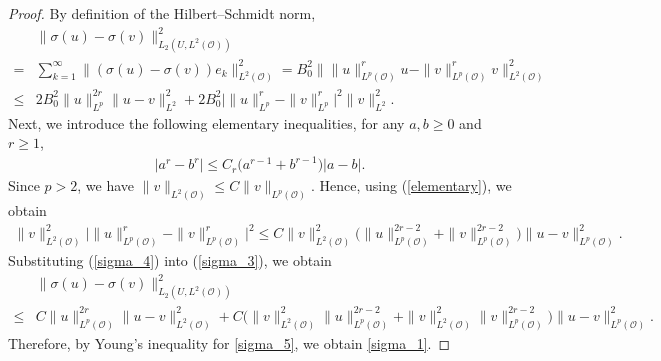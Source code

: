 \documentclass[reqno, 11pt]{amsart}
\theoremstyle{definition}
\numberwithin{equation}{section} \numberwithin{lem}{section}
\numberwithin{thm}{section} \numberwithin{prop}{section}
\numberwithin{cor}{section} \numberwithin{rem}{section}
\numberwithin{defn}{section}
\begin{document}
\begin{proof}
By definition of the Hilbert--Schmidt norm,
\begin{align}\label{sigma_3}
\nonumber&\|\sigma(u)-\sigma(v)\|_{L_2(U,L^2(\mathcal O))}^2
\\\nonumber=&
\sum_{k=1}^\infty \|(\sigma(u)-\sigma(v))e_k\|_{L^2(\mathcal O)}^2=
B_0^2
\big\|\|u\|_{L^p(\mathcal O)}^r u-\|v\|_{L^p(\mathcal O)}^r v\big\|_{L^2(\mathcal O)}^2\\
\le &2B_0^2\|u\|_{L^p}^{2r}\|u-v\|_{L^2}^2
+
2B_0^2\big|\|u\|_{L^p}^r-\|v\|_{L^p}^r\big|^2\|v\|_{L^2}^2.
\end{align}
Next, we introduce the following elementary inequalities, for any $a,b\ge0$ and $r\ge1$,
\begin{align}\label{elementary}
    \big|a^r-b^r\big|\le C_r\big(a^{r-1}+b^{r-1}\big)\big|a-b\big|.
\end{align}
Since $p>2$, we have $\|v\|_{L^2(\mathcal O)}\le C\|v\|_{L^p(\mathcal O)}$. Hence, using   (\ref{elementary}), we obtain 
\begin{align}\label{sigma_4}
    \|v\|_{L^2(\mathcal O)}^2
\big|\|u\|_{L^p(\mathcal O)}^r-\|v\|_{L^p(\mathcal O)}^r\big|^2
\le
C \|v\|_{L^2(\mathcal O)}^2\big(\|u\|_{L^p(\mathcal O)}^{2r-2}+\|v\|_{L^p(\mathcal O)}^{2r-2}\big)\|u-v\|_{L^p(\mathcal O)}^2.
\end{align}
Substituting (\ref{sigma_4}) into (\ref{sigma_3}), we obtain
\begin{align}\label{sigma_5}
    \nonumber&\|\sigma(u)-\sigma(v)\|_{L_2(U,L^2(\mathcal O))}^2
\\\le&
C\|u\|_{L^p(\mathcal O)}^{2r}\|u-v\|_{L^2(\mathcal O)}^2+C\Big(\|v\|_{L^2(\mathcal O)}^2\|u\|_{L^p(\mathcal O)}^{2r-2}+\|v\|_{L^2(\mathcal O)}^2\|v\|_{L^p(\mathcal O)}^{2r-2}\Big)
\|u-v\|_{L^p(\mathcal O)}^2.
\end{align}
Therefore, by Young's inequality for \eqref{sigma_5}, we obtain \eqref{sigma_1}.


\end{proof}
\end{document}
